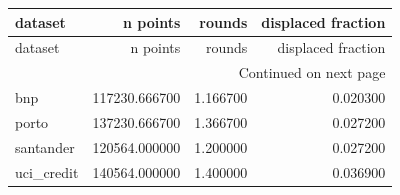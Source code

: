 \begin{center}\label{tab:s8ref}\end{center}
\begingroup\scriptsize\setlength{\tabcolsep}{2.5pt}
\begin{longtable}{lrrr}
\toprule
dataset & n points & rounds & displaced fraction \\
\midrule
\endfirsthead
\toprule
dataset & n points & rounds & displaced fraction \\
\midrule
\endhead
\midrule
\multicolumn{4}{r}{Continued on next page} \\
\midrule
\endfoot
\bottomrule
\endlastfoot
bnp & 117230.666700 & 1.166700 & 0.020300 \\
porto & 137230.666700 & 1.366700 & 0.027200 \\
santander & 120564.000000 & 1.200000 & 0.027200 \\
uci\_credit & 140564.000000 & 1.400000 & 0.036900 \\
\end{longtable}\endgroup\addtocounter{table}{-1}
